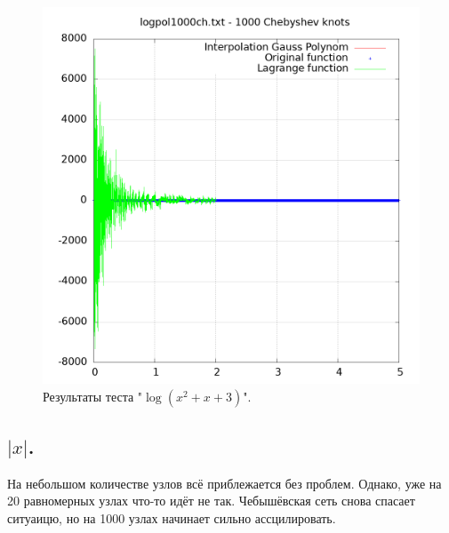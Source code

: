 \documentclass[14pt,a4paper]{extarticle}
\newcommand{\1}{\mathbbm{1}}
\begin{document}
    \begin{figure}
        \centering
        \includegraphics[scale=0.5]{Images/logpol1000ch.txt.png}
        \caption{Результаты теста "$\log(x^2 + x + 3)$".}
    \end{figure}


    \subsection{$|x|$.}

    На небольшом количестве узлов всё приблежается без проблем. Однако, уже на 20 равномерных узлах
    что-то идёт не так. Чебышёвская сеть снова спасает ситуаицю, но на 1000 узлах начинает сильно
    ассцилировать.
\end{document}
